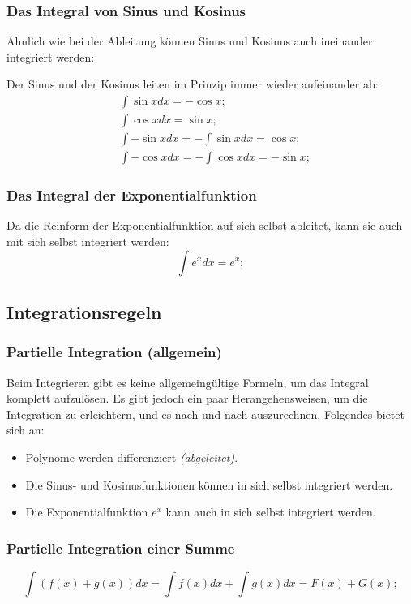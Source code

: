 \documentclass[a4paper]{article}
\begin{document}
\subsubsection{Das Integral von Sinus und Kosinus}
Ähnlich wie bei der Ableitung können Sinus und Kosinus auch ineinander integriert werden:

Der Sinus und der Kosinus leiten im Prinzip immer wieder aufeinander ab:
\begin{align*}
	& \int \sin{x} dx = -\cos{x} ;
	\\
	& \int \cos{x} dx = \sin{x} ;
	\\
	& \int -\sin{x} dx = - \int \sin{x} dx = \cos{x} ;
	\\
	& \int -\cos{x} dx = - \int \cos{x} dx = -\sin{x} ;
\end{align*}

\subsubsection{Das Integral der Exponentialfunktion}
Da die Reinform der Exponentialfunktion auf sich selbst ableitet, kann sie auch mit sich selbst integriert werden:
\[
	\int e^x dx = e^x ;
\]

\subsection{Integrationsregeln}

\subsubsection{Partielle Integration (allgemein)}
Beim Integrieren gibt es keine allgemeingültige Formeln, um das Integral komplett
aufzulösen. Es gibt jedoch ein paar Herangehensweisen, um die Integration zu erleichtern, und es nach und nach auszurechnen. Folgendes bietet sich an:
\begin{itemize}
	\item Polynome werden differenziert \textit{(abgeleitet)}.
	\item Die Sinus- und Kosinusfunktionen können in sich selbst integriert werden.
	\item Die Exponentialfunktion $ e^x $ kann auch in sich selbst integriert werden.
\end{itemize}

\subsubsection{Partielle Integration einer Summe}
\[
	\int \left( f(x) + g(x) \right) dx = \int f(x) dx + \int g(x) dx = F(x) + G(x) ;
\]
\end{document}
